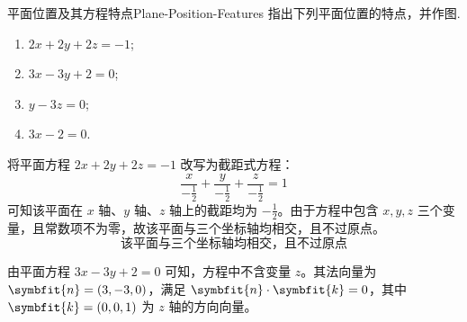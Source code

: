 \begin{problem}{平面位置及其方程特点}{Plane-Position-Features}
    指出下列平面位置的特点，并作图.
    \begin{enumerate}
        \item $2x + 2y + 2z = -1$;
        \item $3x - 3y + 2 = 0$;
        \item $y - 3z = 0$;
        \item $3x - 2 = 0$.
    \end{enumerate}
\end{problem}

\begin{solution}


    将平面方程 $2x + 2y + 2z = -1$ 改写为截距式方程：
    \begin{equation*}
        \frac{x}{-\frac{1}{2}} + \frac{y}{-\frac{1}{2}} + \frac{z}{-\frac{1}{2}} = 1
    \end{equation*}
    可知该平面在 $x$ 轴、$y$ 轴、$z$ 轴上的截距均为 $-\frac{1}{2}$。由于方程中包含 $x, y, z$ 三个变量，且常数项不为零，故该平面与三个坐标轴均相交，且不过原点。
    \begin{equation*}
        \boxed{\text{该平面与三个坐标轴均相交，且不过原点}}
    \end{equation*}

    \begin{center}
    \end{center}


    由平面方程 $3x - 3y + 2 = 0$ 可知，方程中不含变量 $z$。其法向量为 $\symbfit{n} = (3, -3, 0)$，满足 $\symbfit{n} \cdot \symbfit{k} = 0$，其中 $\symbfit{k} = (0, 0, 1)$ 为 $z$ 轴的方向向量。


\end{solution}
